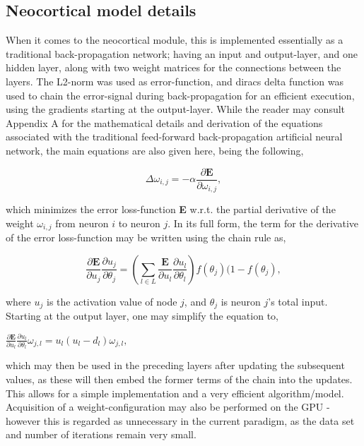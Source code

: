 \subsection{Neocortical model details}

When it comes to the neocortical module, this is implemented essentially as a traditional back-propagation network; having an input and output-layer, and one hidden layer, along with two weight matrices for the connections between the layers. The L2-norm was used as error-function, and diracs delta function was used to chain the error-signal during back-propagation for an efficient execution, using the gradients starting at the output-layer. While the reader may consult Appendix A for the mathematical details and derivation of the equations associated with the traditional feed-forward back-propagation artificial neural network, the main equations are also given here, being the following,

\begin{equation}
    \Delta \omega_{i,j} = -\alpha \frac{\partial \textbf{E}}{\partial \omega_{i,j}},
\end{equation}

\noindent
which minimizes the error loss-function \textbf{E} w.r.t. the partial derivative of the weight $\omega_{i,j}$ from neuron $i$ to neuron $j$.
In its full form, the term for the derivative of the error loss-function may be written using the chain rule as,

\begin{equation}
    \frac{\partial \textbf{E}}{\partial u_j}\frac{\partial u_j}{\partial \theta_j} = 
    (\sum_{l \in L}\frac{\textbf{E}}{\partial u_l}\frac{\partial u_l}{\partial \theta_l}) f(\theta_j)(1-f(\theta_j),
\end{equation}

\noindent
where $u_j$ is the activation value of node $j$, and $\theta_j$ is neuron $j$'s total input. Starting at the output layer, one may simplify the equation to,

\begin{center}
\begin{math}
    \frac{\partial \textbf{E}}{\partial u_l} \frac{\partial u_l}{\partial \theta_l} \omega_{j,l} = 
    u_l (u_l - d_l) \omega_{j,l},
\end{math}
\end{center}

which may then be used in the preceding layers after updating the subsequent values, as these will then embed the former terms of the chain into the updates. This allows for a simple implementation and a very efficient algorithm/model. Acquisition of a weight-configuration may also be performed on the GPU - however this is regarded as unnecessary in the current paradigm, as the data set and number of iterations remain very small.


